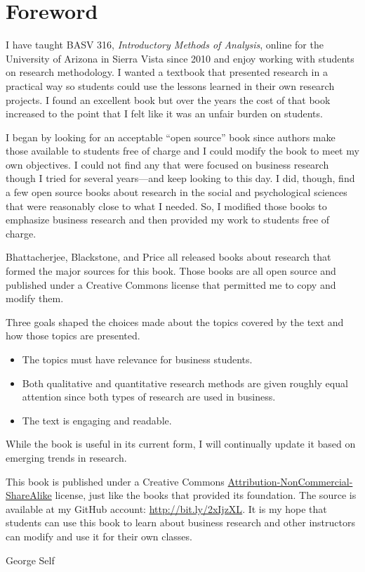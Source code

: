 \chapter*{Foreword}\label{ch:foreword}

I have taught BASV 316, \textit{Introductory Methods of Analysis}, online for the University of Arizona in Sierra Vista since 2010 and enjoy working with students on research methodology. I wanted a textbook that presented research in a practical way so students could use the lessons learned in their own research projects. I found an excellent book but over the years the cost of that book increased to the point that I felt like it was an unfair burden on students. 

I began by looking for an acceptable “open source” book since authors make those available to students free of charge and I could modify the book to meet my own objectives. I could not find any that were focused on business research though I tried for several years—and keep looking to this day. I did, though, find a few open source books about research in the social and psychological sciences that were reasonably close to what I needed. So, I modified those books to emphasize business research and then provided my work to students free of charge. 

Bhattacherjee\cite{bhattacherjee2012social}, Blackstone\cite{blackstone2012principles}, and Price\cite{price2015research} all released books about research that formed the major sources for this book. Those books are all open source and published under a Creative Commons license that permitted me to copy and modify them.

Three goals shaped the choices made about the topics covered by the text and how those topics are presented. 

\begin{itemize}
	\item The topics must have relevance for business students. 
	\item Both qualitative and quantitative research methods are given roughly equal attention since both types of research are used in business. 
	\item The text is engaging and readable.
\end{itemize}

While the book is useful in its current form, I will continually update it based on emerging trends in research. 

This book is published under a Creative Commons \href{https://creativecommons.org/licenses/by-nc-sa/4.0/legalcode}{ Attribution-NonCommercial-ShareAlike} license, just like the books that provided its foundation. The source is available at my GitHub account: \url{http://bit.ly/2xIjzXL}. It is my hope that students can use this book to learn about business research and other instructors can modify and use it for their own classes.

\bigskip
\begin{flushright}
  \textemdash \; George Self
\end{flushright}
